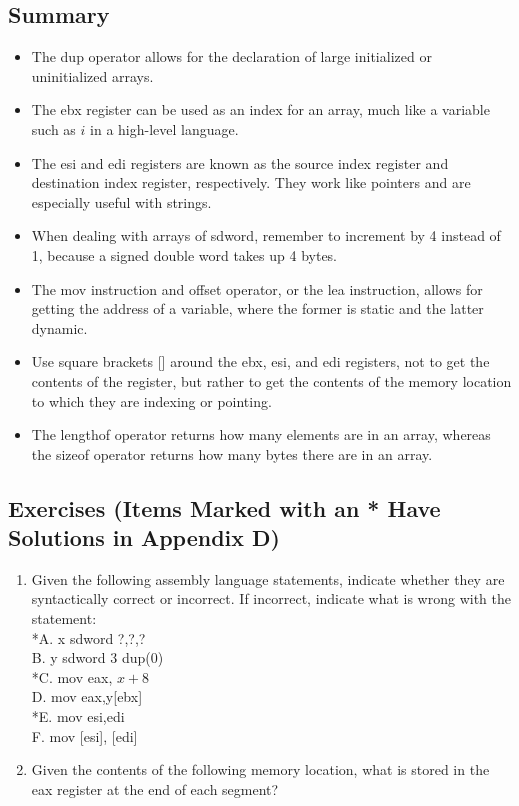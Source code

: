 \documentclass[10pt]{book}
\begin{document}
\subsection{Summary}
\begin{itemize}
  \item The dup operator allows for the declaration of large initialized or uninitialized arrays.
  \item The ebx register can be used as an index for an array, much like a variable such as $i$ in a high-level language.
  \item The esi and edi registers are known as the source index register and destination index register, respectively. They work like pointers and are especially useful with strings.
  \item When dealing with arrays of sdword, remember to increment by 4 instead of 1, because a signed double word takes up 4 bytes.
  \item The mov instruction and offset operator, or the lea instruction, allows for getting the address of a variable, where the former is static and the latter dynamic.
  \item Use square brackets [] around the ebx, esi, and edi registers, not to get the contents of the register, but rather to get the contents of the memory location to which they are indexing or pointing.
  \item The lengthof operator returns how many elements are in an array, whereas the sizeof operator returns how many bytes there are in an array.
\end{itemize}

\subsection{Exercises (Items Marked with an * Have Solutions in Appendix D)}
\begin{enumerate}
  \item Given the following assembly language statements, indicate whether they are syntactically correct or incorrect. If incorrect, indicate what is wrong with the statement:\\
*A. x sdword ?,?,?\\
B. y sdword 3 dup(0)\\
*C. mov eax, $x+8$\\
D. mov eax,y[ebx]\\
*E. mov esi,edi\\
F. mov [esi], [edi]
  \item Given the contents of the following memory location, what is stored in the eax register at the end of each segment?
\end{enumerate}
\end{document}
